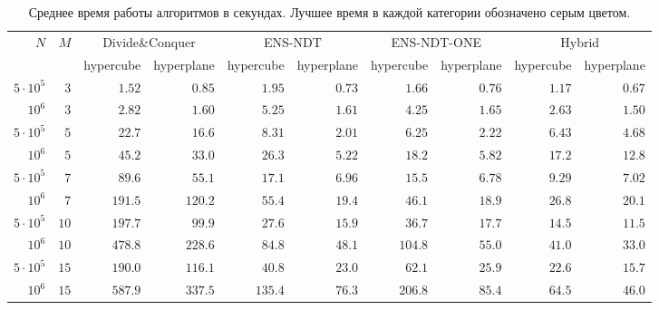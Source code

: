 \newcommand{\best}{\cellcolor{gray!50!white}}

\begin{table}[!ht]
\caption{Среднее время работы алгоритмов в секундах. Лучшее время в каждой категории обозначено серым цветом.}\label{results}
\begin{tabular}{rr|rr|rr|rr|rr}
$N$&$M$ & \multicolumn{2}{c|}{Divide\&Conquer} 
        & \multicolumn{2}{c|}{ENS-NDT} 
        & \multicolumn{2}{c|}{ENS-NDT-ONE} 
        & \multicolumn{2}{c}{Hybrid} \\
& & {\scriptsize hypercube} & {\scriptsize hyperplane} 
  & {\scriptsize hypercube} & {\scriptsize hyperplane} 
  & {\scriptsize hypercube} & {\scriptsize hyperplane} 
  & {\scriptsize hypercube} & {\scriptsize hyperplane} \\\hline
$5\cdot10^5$&$3$  & $1.52$ & $0.85$ & $1.95$ & $0.73$ & $1.66$ & $0.76$ & \best $1.17$ & \best $0.67$\\
      $10^6$&$3$  & $2.82$ & $1.60$ & $5.25$ & $1.61$ & $4.25$ & $1.65$ & \best $2.63$ & \best $1.50$\\\hline
$5\cdot10^5$&$5$  & $22.7$ & $16.6$ & $8.31$ & \best $2.01$ & \best $6.25$ & $2.22$ & $6.43$ & $4.68$\\
      $10^6$&$5$  & $45.2$ & $33.0$ & $26.3$ & \best $5.22$ & $18.2$ & $5.82$ & \best $17.2$ & $12.8$\\\hline
$5\cdot10^5$&$7$  & $89.6$ & $55.1$ & $17.1$ & $6.96$ & $15.5$ & \best $6.78$ & \best $9.29$ & $7.02$\\
      $10^6$&$7$  & $191.5$& $120.2$& $55.4$ & $19.4$ & $46.1$ & \best $18.9$ & \best $26.8$ & $20.1$\\\hline
$5\cdot10^5$&$10$ & $197.7$& $99.9$ & $27.6$ & $15.9$ & $36.7$ & $17.7$ & \best $14.5$ & \best $11.5$\\
      $10^6$&$10$ & $478.8$& $228.6$& $84.8$ & $48.1$ & $104.8$& $55.0$ & \best $41.0$ & \best $33.0$\\\hline
$5\cdot10^5$&$15$ & $190.0$& $116.1$& $40.8$ & $23.0$ & $62.1$ & $25.9$ & \best $22.6$ & \best $15.7$\\
      $10^6$&$15$ & $587.9$& $337.5$& $135.4$& $76.3$ & $206.8$& $85.4$ & \best $64.5$ & \best $46.0$\\\hline
\end{tabular}
\end{table}

